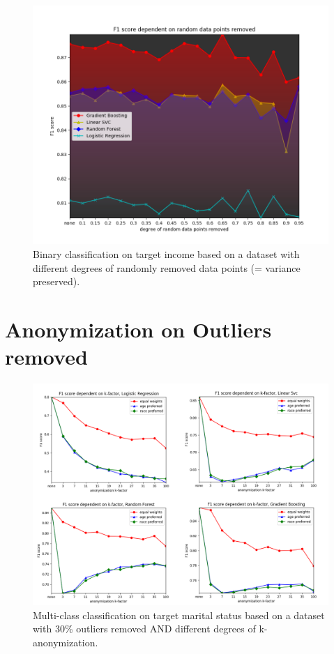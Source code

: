 \documentclass{llncs}
\begin{document}
\begin{figure}[!h]
	\centering
	\includegraphics[width=1\textwidth]{figures/outliers/randomly_removed_points_all_algos_blur}
	\caption{Binary classification on target income based on a dataset with different degrees of randomly removed data points (= variance preserved).}
	\label{fig:results_random_removed}
\end{figure}




\section{Anonymization on Outliers removed}

\begin{figure}[!h]
	\centering
	\includegraphics[width=1\textwidth]{figures/anon_outliers/anon_outliers_marital_combined}
	\caption{Multi-class classification on target marital status based on a dataset with 30\% outliers removed AND different degrees of k-anonymization.}
	\label{fig:results_anonymization_outliers_marital_status}
\end{figure}
\end{document}
